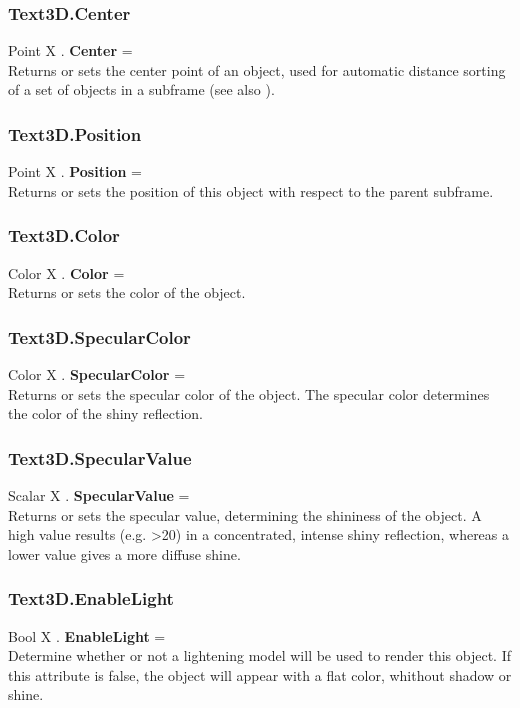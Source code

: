 \subsubsection{Text3D.Center \label{F:Text3D:Center}}
Point X . \textbf{Center} = \\
Returns or sets the center point of an object, used for automatic distance sorting of a set of objects in a subframe (see also ).

\subsubsection{Text3D.Position \label{F:Text3D:Position}}
Point X . \textbf{Position} = \\
Returns or sets the position of this object with respect to the parent subframe.

\subsubsection{Text3D.Color \label{F:Text3D:Color}}
Color X . \textbf{Color} = \\
Returns or sets the color of the object.

\subsubsection{Text3D.SpecularColor \label{F:Text3D:SpecularColor}}
Color X . \textbf{SpecularColor} = \\
Returns or sets the specular color of the object. The specular color determines the color of the shiny reflection.

\subsubsection{Text3D.SpecularValue \label{F:Text3D:SpecularValue}}
Scalar X . \textbf{SpecularValue} = \\
Returns or sets the specular value, determining the shininess of the object. A high value results (e.g. >20) in a concentrated, intense shiny reflection, whereas a lower value gives a more diffuse shine.

\subsubsection{Text3D.EnableLight \label{F:Text3D:EnableLight}}
Bool X . \textbf{EnableLight} = \\
Determine whether or not a lightening model will be used to render this object. If this attribute is false, the object will appear with a flat color, whithout shadow or shine.

